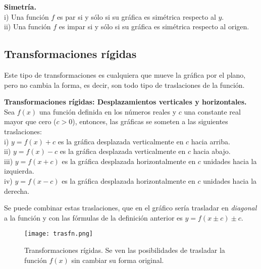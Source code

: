 \begin{mydef}
\textbf{Simetría.}\\
\noindent i) Una función $f$ es par si y sólo si su gráfica es simétrica respecto al $y$. \\
\noindent ii) Una función $f$ es impar si y sólo si su gráfica es simétrica respecto al origen.\\
\end{mydef}

\subsection{Transformaciones rígidas}
Este tipo de transformaciones es cualquiera que mueve la gráfica por el plano, pero no cambia la forma, es decir, son todo tipo de traslaciones de la función.\\

\begin{mydef}
\textbf{Transformaciones rígidas: Desplazamientos verticales y horizontales.} Sea $f(x)$ una función definida en los números reales y $c$ una constante real mayor que cero ($c>0$), entonces, las gráficas se someten a las siguientes traslaciones:\\

\noindent i) $y=f(x)+c$ es la gráfica desplazada verticalmente en $c$ hacia arriba.\\

\noindent ii) $y=f(x)-c$ es la gráfica desplazada verticalmente en $c$ hacia abajo.\\

\noindent iii) $y=f(x+c)$ es la gráfica desplazada horizontalmente en $c$ unidades hacia la izquierda.\\

\noindent iv) $y=f(x-c)$ es la gráfica desplazada horizontalmente en $c$ unidades hacia la derecha.\\
\end{mydef}

Se puede combinar estas traslaciones, que en el gráfico sería trasladar en \textit{diagonal} a la función y con las fórmulas de la definición anterior es $y=f(x\pm c)\pm c$.

\begin{center}
\begin{figure}[h!]
\centering
\texttt{[image: trasfn.png]}
\caption[Transformaciones rígidas.]{Transformaciones rígidas. Se ven las posibilidades de trasladar la función $f(x)$ sin cambiar su forma original.}
\label{trasfx}
\end{figure}
\end{center}

